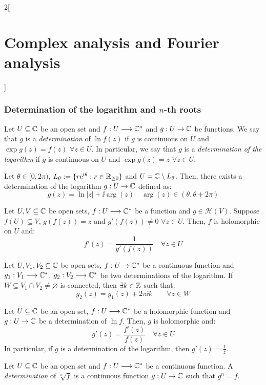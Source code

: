 \documentclass[../../../main.tex]{subfiles}
\begin{document}
\begin{multicols}{2}[\section{Complex analysis and Fourier analysis}]
  \subsubsection{Determination of the logarithm and \texorpdfstring{$n$}{n}-th roots}
  \begin{definition}
    Let $U\subseteq\mathbb{C}$ be an open set and $f:U\longrightarrow\mathbb{C}^*$ and $g:U\rightarrow\mathbb{C}$ be functions. We say that $g$ is a \emph{determination} of $\ln f(z)$ if $g$ is continuous on $U$ and $\exp{g(z)}=f(z)$ $\forall z\in U$. In particular, we say that $g$ is a \emph{determination of the logarithm} if $g$ is continuous on $U$ and $\exp{g(z)}=z$ $\forall z\in U$.
  \end{definition}
  \begin{proposition}
    Let $\theta\in[0,2\pi)$, $L_\theta:=\{r\mathrm{e}^{\mathrm{i}\theta}:r\in\mathbb{R}_{\geq 0}\}$ and $U=\mathbb{C}\setminus L_\theta$. Then, there exists a determination of the logarithm $g:U\rightarrow\mathbb{C}$ defined as:
    $$g(z)=\ln |z|+\ii\arg(z)\quad\arg(z)\in(\theta,\theta+2\pi)$$
  \end{proposition}
  \begin{theorem}
    Let $U,V\subseteq\mathbb{C}$ be open sets, $f:U\longrightarrow\mathbb{C}^*$ be a function and $g\in\mathcal{H}(V)$. Suppose $f(U)\subseteq V$, $g(f(z))=z$ and $g'(f(z))\ne 0$ $\forall z\in U$. Then, $f$ is holomorphic on $U$ and: $$f'(z)=\frac{1}{g'(f(z))}\quad\forall z\in U$$
  \end{theorem}
  \begin{proposition}
    Let $U,V_1,V_2\subseteq\mathbb{C}$ be open sets, $f:U\rightarrow\mathbb{C}^*$ be a continuous function and $g_1:V_1\longrightarrow\mathbb{C}^*$, $g_2:V_2\longrightarrow\mathbb{C}^*$ be two determinations of the logarithm. If $W\subseteq V_1\cap V_2\ne\varnothing$ is connected, then $\exists k\in\mathbb{Z}$ such that: $$g_2(z)=g_1(z)+2\pi \ii k\qquad\forall z\in W$$
  \end{proposition}
  \begin{corollary}
    Let $U\subseteq\mathbb{C}$ be an open set, $f:U\longrightarrow\mathbb{C}^*$ be a holomorphic function and $g:U\rightarrow\mathbb{C}$ be a determination of $\ln f$. Then, $g$ is holomorphic and: $$g'(z)=\frac{f'(z)}{f(z)}\quad \forall z\in U$$
    In particular, if $g$ is a determination of the logarithm, then $g'(z)=\frac{1}{z}$.
  \end{corollary}
  \begin{definition}
    Let $U\subseteq\mathbb{C}$ be an open set and $f:U\longrightarrow\mathbb{C}^*$ be a continuous function. A \emph{determination} of $\sqrt[n]{f}$ is a continuous function $g:U\rightarrow\mathbb{C}$ such that $g^n=f$.

\end{definition}
\end{multicols}
\end{document}
